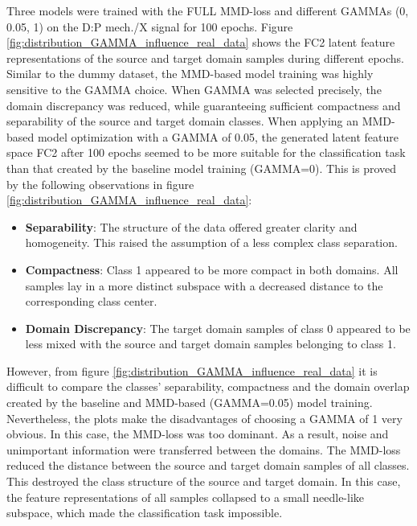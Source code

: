 Three models were trained with the FULL MMD-loss and different GAMMAs (0, 0.05, 1) on the D:P mech./X signal for 100 epochs. Figure \ref{fig:distribution_GAMMA_influence_real_data} 
shows the FC2 latent feature representations of the source and target domain samples during
different epochs. Similar to the dummy dataset, the MMD-based model training was highly sensitive to the GAMMA choice. When GAMMA was selected precisely, the domain discrepancy was reduced, while guaranteeing sufficient compactness and separability of the source and target domain classes. When applying an MMD-based model optimization with a GAMMA of 0.05, the generated latent feature space FC2 after 100 epochs seemed to be more suitable for the classification task than that created by the baseline model training (GAMMA=0). This is proved by the following observations in figure \ref{fig:distribution_GAMMA_influence_real_data}:
\begin{itemize}
    \item \textbf{Separability}: The structure of the data offered greater clarity and homogeneity. This raised the assumption of a less complex class separation.
    \item \textbf{Compactness}: Class 1 appeared to be more compact in both domains. All samples lay in a more distinct subspace with a decreased distance to the corresponding class center.
    \item \textbf{Domain Discrepancy}: The target domain samples of class 0 appeared to be less mixed with the source and target domain samples belonging to class 1. 
\end{itemize}

However, from figure \ref{fig:distribution_GAMMA_influence_real_data} it is difficult to compare the classes' separability, compactness and the domain overlap created by the baseline and MMD-based (GAMMA=0.05) model training. Nevertheless, the plots make the disadvantages of choosing a GAMMA of 1 very obvious. In this case, the MMD-loss was too dominant. As a result, noise and unimportant information were transferred between the domains. The MMD-loss reduced the distance between the source and target domain samples of all classes. This destroyed the class structure of the source and target domain. In this case, the feature representations of all samples collapsed to a small needle-like subspace, which made the classification task impossible.

